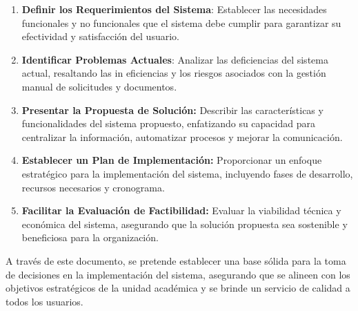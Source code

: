 {\begin{enumerate}


\item { \textbf{Definir los Requerimientos del Sistema}: Establecer las necesidades funcionales 
	y no funcionales que el sistema debe cumplir para garantizar su
	efectividad y satisfacción del usuario.}
	
\item {\textbf{Identificar Problemas Actuales}: Analizar las deficiencias del sistema
	actual, resaltando las in eficiencias y los riesgos asociados con la gestión
	manual de solicitudes y documentos.}
\item {\textbf{Presentar la Propuesta de Solución: }Describir las características y
	funcionalidades del sistema propuesto, enfatizando su capacidad para centralizar 
	la información, automatizar procesos y mejorar la comunicación.}

\item {\textbf{Establecer un Plan de Implementación: }Proporcionar un enfoque
estratégico para la implementación del sistema, incluyendo fases de desarrollo, 
recursos necesarios y cronograma.}

\item{\textbf{Facilitar la Evaluación de Factibilidad: }Evaluar la viabilidad técnica y
	 económica del sistema, asegurando que la solución propuesta sea
sostenible y beneficiosa para la organización.}
\end{enumerate}
A través de este documento, se pretende establecer una base sólida para la toma
de decisiones en la implementación del sistema, asegurando que se alineen con
los objetivos estratégicos de la unidad académica y se brinde un servicio de
calidad a todos los usuarios.
}
